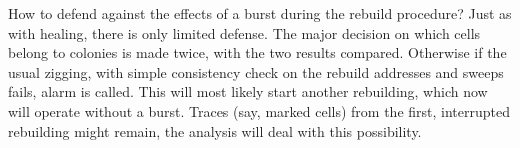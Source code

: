 \documentclass[12pt]{memoir}
\newcommand{\fld}[1]{\ensuremath{\textit{#1}}}
\def\B{B}
\newcommand{\E}{E}
\newcommand{\Addr}{\fld{Addr}}
\newcommand{\Arb}{\fld{Arb}}
\newcommand{\cArb}{\fld{cArb}}
\newcommand{\Core}{\fld{Core}}
\newcommand{\Sweep}{\fld{Sw}}
\newcommand{\cSweep}{\fld{cSw}}
\newcommand{\TransferSw}{\mathrm{TransferSw}}
\begin{document}
How to defend against the effects of a burst during the rebuild procedure?
Just as with healing, there is only limited defense.
The major decision on which cells belong to colonies is made twice, with the
two results compared.
Otherwise if the usual zigging, with simple consistency check on the rebuild addresses
and sweeps fails, alarm is called.
This will most likely start another rebuilding, which now will operate without a burst.
Traces (say, marked cells) from the first, interrupted rebuilding might remain,
the analysis will deal with this possibility.




\end{document}
